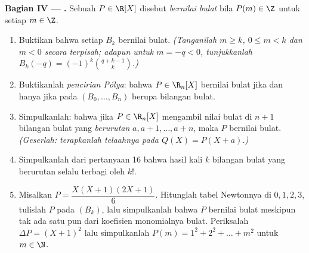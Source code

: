 \begin{problem}
\medskip
\noindent\textbf{Bagian IV --- .} Sebuah
 $P \in \R[X]$ disebut \emph{bernilai bulat} bila $P(m) \in
\Z$ untuk setiap $m \in \Z$.
\begin{enumerate}[resume]
  \item Buktikan bahwa setiap $B_k$ bernilai bulat. \emph{(Tanganilah $m
        \geq k$, $0 \leq m < k$ dan $m < 0$ secara terpisah; adapun untuk $m =
        -q < 0$, tunjukkanlah $B_k(-q) = (-1)^k \binom{q + k - 1}{k}$.)}
  \item Buktikanlah \emph{pencirian Pólya}: bahwa $P \in \R_n[X]$
        bernilai bulat jika dan hanya jika  pada
         $(B_0, \dots, B_n)$ berupa bilangan bulat.
  \item Simpulkanlah: bahwa jika $P \in \R_n[X]$ mengambil nilai bulat di $n + 1$
        bilangan bulat yang \emph{berurutan} $a, a+1, \dots, a+n$, maka $P$
        bernilai bulat. \emph{(Geserlah: terapkanlah telaahnya pada $Q(X)
        = P(X + a)$.)}
  \item Simpulkanlah dari pertanyaan 16 bahwa hasil kali $k$ bilangan bulat
        yang berurutan selalu terbagi oleh $k!$.
  \item Misalkan $P = \dfrac{X(X+1)(2X+1)}{6}$. Hitunglah tabel Newtonnya
        di $0, 1, 2, 3$, tulislah $P$ pada  $(B_k)$, lalu
        simpulkanlah bahwa $P$ bernilai bulat meskipun tak ada satu pun dari
        koefisien monomialnya bulat. Periksalah $\Delta P =
        (X+1)^2$ lalu simpulkanlah $P(m) = 1^2 + 2^2 + \dots + m^2$ untuk
        $m \in \N$.
\end{enumerate}


\end{problem}
